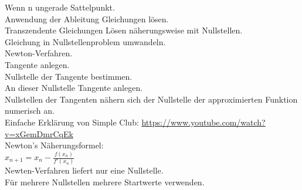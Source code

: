 \documentclass{article}
\begin{document}
	Wenn n ungerade Sattelpunkt. \\
	Anwendung der Ableitung Gleichungen lösen. \\
	Transzendente Gleichungen Lösen näherungsweise mit Nullstellen. \\
	Gleichung in Nullstellenproblem umwandeln. \\
	Newton-Verfahren. \\
	Tangente anlegen. \\
	Nullstelle der Tangente bestimmen. \\
	An dieser Nullstelle Tangente anlegen. \\
	Nullstellen der Tangenten nähern sich der Nullstelle der approximierten Funktion numerisch an. \\
	Einfache Erklärung von Simple Club: \url{https://www.youtube.com/watch?v=xGemDmrCqEk} \\
	Newton's Näherungsformel: \\
	$x_{n+1} = x_n - \frac{f(x_n)}{f'(x_n)}$ \\
	Newten-Verfahren liefert nur eine Nullstelle. \\
	Für mehrere Nullstellen mehrere Startwerte verwenden. \\
\end{document}
